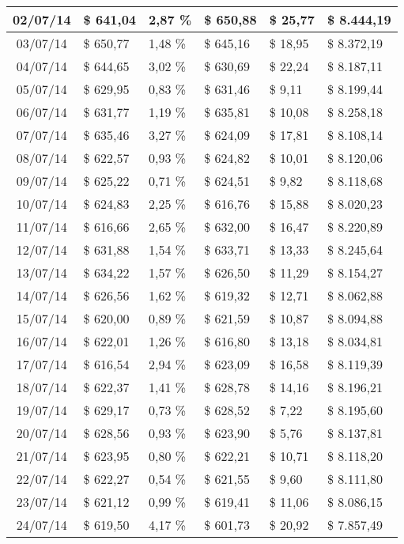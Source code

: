 \begin{small}
\begin{longtable}{|c|l|l|l|l|l|}
02/07/14 & \$ 641,04 & 2,87 \% & \$ 650,88 & \$ 25,77 & \$ 8.444,19 \\ \hline
03/07/14 & \$ 650,77 & 1,48 \% & \$ 645,16 & \$ 18,95 & \$ 8.372,19 \\ \hline
04/07/14 & \$ 644,65 & 3,02 \% & \$ 630,69 & \$ 22,24 & \$ 8.187,11 \\ \hline
05/07/14 & \$ 629,95 & 0,83 \% & \$ 631,46 & \$ 9,11 & \$ 8.199,44 \\ \hline
06/07/14 & \$ 631,77 & 1,19 \% & \$ 635,81 & \$ 10,08 & \$ 8.258,18 \\ \hline
07/07/14 & \$ 635,46 & 3,27 \% & \$ 624,09 & \$ 17,81 & \$ 8.108,14 \\ \hline
08/07/14 & \$ 622,57 & 0,93 \% & \$ 624,82 & \$ 10,01 & \$ 8.120,06 \\ \hline
09/07/14 & \$ 625,22 & 0,71 \% & \$ 624,51 & \$ 9,82 & \$ 8.118,68 \\ \hline
10/07/14 & \$ 624,83 & 2,25 \% & \$ 616,76 & \$ 15,88 & \$ 8.020,23 \\ \hline
11/07/14 & \$ 616,66 & 2,65 \% & \$ 632,00 & \$ 16,47 & \$ 8.220,89 \\ \hline
12/07/14 & \$ 631,88 & 1,54 \% & \$ 633,71 & \$ 13,33 & \$ 8.245,64 \\ \hline
13/07/14 & \$ 634,22 & 1,57 \% & \$ 626,50 & \$ 11,29 & \$ 8.154,27 \\ \hline
14/07/14 & \$ 626,56 & 1,62 \% & \$ 619,32 & \$ 12,71 & \$ 8.062,88 \\ \hline
15/07/14 & \$ 620,00 & 0,89 \% & \$ 621,59 & \$ 10,87 & \$ 8.094,88 \\ \hline
16/07/14 & \$ 622,01 & 1,26 \% & \$ 616,80 & \$ 13,18 & \$ 8.034,81 \\ \hline
17/07/14 & \$ 616,54 & 2,94 \% & \$ 623,09 & \$ 16,58 & \$ 8.119,39 \\ \hline
18/07/14 & \$ 622,37 & 1,41 \% & \$ 628,78 & \$ 14,16 & \$ 8.196,21 \\ \hline
19/07/14 & \$ 629,17 & 0,73 \% & \$ 628,52 & \$ 7,22 & \$ 8.195,60 \\ \hline
20/07/14 & \$ 628,56 & 0,93 \% & \$ 623,90 & \$ 5,76 & \$ 8.137,81 \\ \hline
21/07/14 & \$ 623,95 & 0,80 \% & \$ 622,21 & \$ 10,71 & \$ 8.118,20 \\ \hline
22/07/14 & \$ 622,27 & 0,54 \% & \$ 621,55 & \$ 9,60 & \$ 8.111,80 \\ \hline
23/07/14 & \$ 621,12 & 0,99 \% & \$ 619,41 & \$ 11,06 & \$ 8.086,15 \\ \hline
24/07/14 & \$ 619,50 & 4,17 \% & \$ 601,73 & \$ 20,92 & \$ 7.857,49 \\ \hline

\end{longtable}
\end{small}
